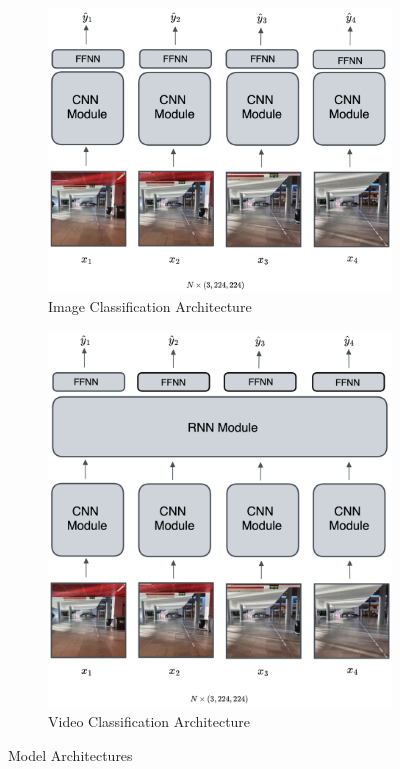 \documentclass{article}
\begin{document}
  \begin{figure}[ht]
    \centering
    \begin{subfigure}[b]{0.42\linewidth}
      \centering
      \includegraphics[width=\linewidth]{figures/cnn-architecture.png}
      \caption{Image Classification Architecture}
      \label{fig:cnn-architecture}
    \end{subfigure}
    \hfill
    \begin{subfigure}[b]{0.42\linewidth}
      \centering
      \includegraphics[width=\linewidth]{figures/rnn-architecture.png}
      \caption{Video Classification Architecture}
      \label{fig:rnn-architecture}
    \end{subfigure}
    \caption{Model Architectures}
    \label{fig:model-architectures}
  \end{figure}
\end{document}
